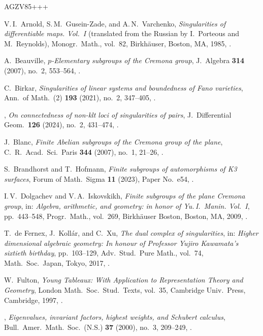 \begin{thebibliography}{AGZV85+++}

V.\,I.~Arnold, S.\,M.~Gusein-Zade, and A.\,N.~Varchenko,
{\em Singularities of differentiable maps. Vol.~I} (translated from the Russian by I.~Porteous and M.~Reynolds),
Monogr.\ Math., vol.~82, Birkh\"auser, Boston, MA, 1985,
.

A.~Beauville, 
{\em $p$-Elementary subgroups of the Cremona group},
J.~Algebra \textbf{314} (2007), no.~2, 553--564,
.

C.~Birkar,
{\em Singularities of linear systems and boundedness of Fano varieties},
Ann.\ of Math.~(2) \textbf{193} (2021), no.~2, 347--405,
.

\bysame, 
{\em On connectedness of non-klt loci of singularities of pairs}, 
J.~Differential Geom.\ \textbf{126} (2024), no.~2, 431--474,
.

J.~Blanc,
{\em Finite Abelian subgroups of the Cremona group of the plane},
C.\ R.\ Acad.\ Sci.\ Paris \textbf{344} (2007), no.~1, 21--26,
.

S.~Brandhorst and T.~Hofmann, 
{\em Finite subgroups of automorphisms of K3 surfaces}, 
Forum of Math.\ Sigma \textbf{11} (2023), Paper No.~e54,
.

I.\,V.~Dolgachev and V.\,A.~Iskovskikh, 
{\em Finite subgroups of the plane Cremona group},
in: {\em Algebra, arithmetic, and geometry: in honor of Yu.\,I.~Manin. 
Vol.~I}, pp.~443--548, Progr.\ Math., vol.~269, Birkh\"auser Boston,
Boston, MA, 2009,
.

T.~de Fernex, J.~Koll\'ar, and C.~Xu,
{\em The dual complex of singularities},
in: {\em Higher dimensional algebraic geometry: In honour of Professor Yujiro Kawamata's sixtieth birthday}, pp.~103--129, Adv.\ Stud.\ Pure Math., vol.~74, Math.\ Soc.\ Japan, Tokyo, 2017,
.

W.~Fulton, 
 {\em Young Tableaux: With Application to Representation Theory and Geometry}, 
 London Math.\ Soc.\ Stud.\ Texts, vol.~35, Cambridge Univ.\ Press, Cambridge, 1997, .

\bysame, 
 {\em Eigenvalues, invariant factors, highest weights, and Schubert calculus},
 Bull.\ Amer.\ Math.\ Soc.\ (N.S.) \textbf{37} (2000), no.~3, 209--249,
 .


\end{thebibliography}
